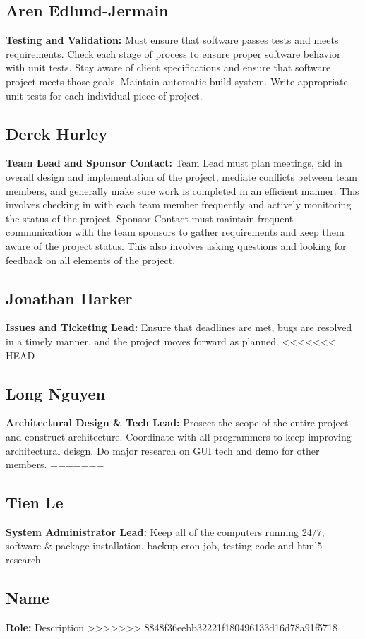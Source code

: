 \documentclass[12pt, letterpaper]{article}
\begin{document}
  \subsection{Aren Edlund-Jermain}
  {\bf Testing and Validation:} Must ensure that software passes tests and meets requirements. Check each stage of process to ensure proper software behavior with unit tests. Stay aware of client specifications and ensure that software project meets those goals. Maintain automatic build system. Write appropriate unit tests for each individual piece of project.
  \subsection{Derek Hurley}
  {\bf Team Lead and Sponsor Contact:} Team Lead must plan meetings, aid in overall design and implementation of the project, mediate conflicts between team members, and generally make sure work is completed in an efficient manner. This involves checking in with each team member frequently and actively monitoring the status of the project. Sponsor Contact must maintain frequent communication with the team sponsors to gather requirements and keep them aware of the project status. This also involves asking questions and looking for feedback on all elements of the project.
  \subsection{Jonathan Harker}
  {\bf Issues and Ticketing Lead:} Ensure that deadlines are met, bugs are resolved in a timely manner, and the project moves forward as planned.
<<<<<<< HEAD
  \subsection{Long Nguyen}
  {\bf Architectural Design & Tech Lead:} Prosect the scope of the entire project and construct architecture. Coordinate with all programmers to keep improving architectural deisgn. Do major research on GUI tech and demo for other members.
=======
  \subsection{Tien Le}
  {\bf System Administrator Lead:} Keep all of the computers running 24/7, software & package installation, backup cron job, testing code and html5 research. 
  \subsection{Name}
  {\bf Role:} Description
>>>>>>> 8848f36eebb32221f180496133d16d78a91f5718
\end{document}
